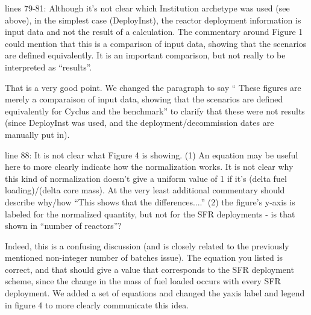 \documentclass[answers,11pt]{exam}
\begin{document}
\begin{questions}
        \question lines 79-81: Although it's not clear which Institution 
        archetype was used (see above), in the simplest case (DeployInst), the 
        reactor deployment information is input data and not the result of a 
        calculation.  The commentary around Figure 1 could mention that this is 
        a comparison of input data, showing that the scenarios are defined 
        equivalently.  It is an important comparison, but not really to be 
        interpreted as ``results''.

        \begin{solution}
        That is a very good point. We changed the paragraph to say
        `` These figures are merely a comparaison of input data, showing that
        the scenarios are defined equivalently for Cyclus and the benchmark''
        to clarify that these were not results (since DeployInst was used,
        and the deployment/decommission dates are manually put in).
        \end{solution}


        \question line 88: It is not clear what Figure 4 is showing.  (1) An 
        equation may be useful here to more clearly indicate how the 
        normalization works. It is not clear why this kind of normalization 
        doesn't give a uniform value of 1 if it's (delta fuel loading)/(delta 
        core mass).  At the very least additional commentary should describe 
        why/how ``This shows that the differences....''  (2) the figure's 
        y-axis is labeled for the normalized quantity, but not for the SFR 
        deployments - is that shown in ``number of reactors''?

        \begin{solution}
                Indeed, this is a confusing discussion (and is closely related 
                to the previously mentioned non-integer number of batches 
                issue). The equation you listed is correct, and that should 
                give a value that corresponds to the SFR deployment scheme, 
                since the change in the mass of fuel loaded occurs with every 
                SFR deployment. We added a set of equations and changed the 
                yaxis label and legend in figure 4 to more clearly communicate 
                this idea.
        \end{solution}


\end{questions}
\end{document}

